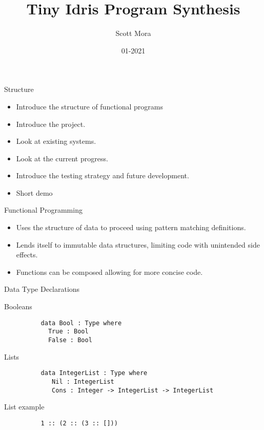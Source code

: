 \documentclass[presentation]{beamer}
\author{Scott Mora}
\date{01-2021}
\title{Tiny Idris Program Synthesis}
\begin{document}
\maketitle

\begin{frame}[fragile]{Structure}
  \begin{itemize}
  \item {Introduce the structure of functional programs}
  \item {Introduce the project.}
  \item {Look at existing systems.}
  \item {Look at the current progress.}
  \item {Introduce the testing strategy and future development.}
  \item {Short demo}
  \end{itemize}
\end{frame}

\begin{frame}[fragile]{Functional Programming}
  \begin{itemize}
  \item {Uses the structure of data to proceed using
    pattern matching definitions.}
  \item {Lends itself to immutable data structures, limiting
    code with unintended side effects.}
  \item {Functions can be composed allowing for more
    concise code.}
  \end{itemize}
\end{frame}

\begin{frame}[fragile]{Data Type Declarations}
      \begin{block}{Booleans}
        \begin{verbatim}
          data Bool : Type where
            True : Bool
            False : Bool
        \end{verbatim}
      \end{block}
    
      \begin{block}{Lists}
        \begin{verbatim}
          data IntegerList : Type where
             Nil : IntegerList 
             Cons : Integer -> IntegerList -> IntegerList
        \end{verbatim}
      \end{block}

      \begin{block}{List example}
        \begin{verbatim}
          1 :: (2 :: (3 :: []))
        \end{verbatim}
      \end{block}
\end{frame}
\end{document}
